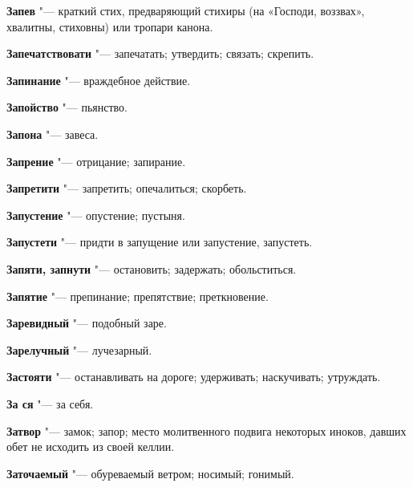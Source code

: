 \begin{mymulticols}{2}
\noindent\textbf{Запев} "--- краткий стих, предваряющий стихиры (на «Господи, воззвах», хвалитны, стиховны) или тропари канона. 




\noindent\textbf{Запечатствовати} "--- запечатать; утвердить; связать; скрепить. 




\noindent\textbf{Запинание} "--- враждебное действие. 




\noindent\textbf{Запойство} "--- пьянство. 




\noindent\textbf{Запона} "--- завеса. 




\noindent\textbf{Запрение} "--- отрицание; запирание. 




\noindent\textbf{Запретити} "--- запретить; опечалиться; скорбеть. 




\noindent\textbf{Запустение} "--- опустение; пустыня. 




\noindent\textbf{Запустети} "--- придти в запущение или запустение, запустеть. 




\noindent\textbf{Запяти, запнути} "--- остановить; задержать; обольститься. 




\noindent\textbf{Запятие} "--- препинание; препятствие; преткновение. 




\noindent\textbf{Заревидный} "--- подобный заре. 




\noindent\textbf{Зарелучный} "--- лучезарный. 




\noindent\textbf{Застояти} "--- останавливать на дороге; удерживать; наскучивать; утруждать. 




\noindent\textbf{За ся} "--- за себя. 




\noindent\textbf{Затвор} "--- замок; запор; место молитвенного подвига некоторых иноков, давших обет не исходить из своей келлии. 




\noindent\textbf{Заточаемый} "--- обуреваемый ветром; носимый; гонимый. 





\end{mymulticols}
